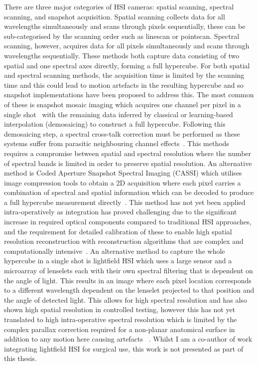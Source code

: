 There are three major categories of HSI cameras: spatial scanning, spectral scanning, and snapshot acquisition. Spatial scanning collects data for all wavelengths simultaneously and scans through pixels sequentially, these can be sub-categorised by the scanning order such as linescan or pointscan. Spectral scanning, however, acquires data for all pixels simultaneously and scans through wavelengths sequentially. These methods both capture data consisting of two spatial and one spectral axes directly, forming a full hypercube. For both spatial and spectral scanning methods, the acquisition time is limited by the scanning time and this could lead to motion artefacts in the resulting hypercube and so snapshot implementations have been proposed to address this. The most common of these is snapshot mosaic imaging which acquires one channel per pixel in a single shot~\cite{Geelen2014} with the remaining data inferred by classical or learning-based~\cite{Li2021} interpolation (demosaicing) to construct a full hypercube. Following this demosaicing step, a spectral cross-talk correction must be performed as these systems suffer from parasitic neighbouring channel effects~\cite{Pichette2017}. This methods requires a compromise between spatial and spectral resolution where the number of spectral bands is limited in order to preserve spatial resolution. An alternative method is Coded Aperture Snapshot Spectral Imaging (CASSI) which utilises image compression tools to obtain a 2D acquisition where each pixel carries a combination of spectral and spatial information which can be decoded to produce a full hypercube measurement directly~\cite{Song2022, Eldar2009}. This method has not yet been applied intra-operatively as integration has proved challenging due to the significant increase in required optical components compared to traditional HSI approaches, and the requirement for detailed calibration of these to enable high spatial resolution reconstruction with reconstruction algorithms that are complex and computationally intensive~\cite{Song2022}. An alternative method to capture the whole hypercube in a single shot is lightfield HSI which uses a large sensor and a microarray of lenselets each with their own spectral filtering that is dependent on the angle of light. This results in an image where each pixel location corresponds to a different wavelength dependent on the lenselet projected to that position and the angle of detected light. This allows for high spectral resolution and has also shown high spatial resolution in controlled testing, however this has not yet translated to high intra-operative spectral resolution which is limited by the complex parallax correction required for a non-planar anatomical surface in addition to any motion here causing artefacts~
\cite{MacCormac2023}. Whilst I am a co-author of work integrating lightfield HSI for surgical use, this work is not presented as part of this thesis. 

